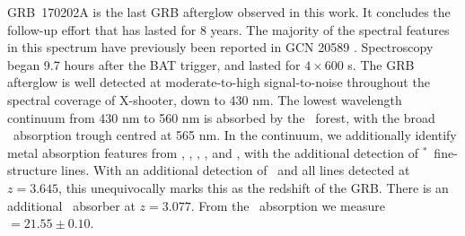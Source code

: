 \documentclass[longauth]{aa}    %
\begin{document}
GRB~170202A is the last GRB afterglow observed in this work. It concludes the
follow-up effort that has lasted for 8 years. The majority of the spectral
features in this spectrum have previously been reported in GCN 20589
\citep{GCN20589}. Spectroscopy began 9.7 hours after the BAT trigger, and lasted
for $4 \times 600$ s. The GRB afterglow is well detected at moderate-to-high
signal-to-noise throughout the spectral coverage of X-shooter, down to 430 nm.
The lowest wavelength continuum from 430 nm to 560 nm is absorbed by the
\lya~forest, with the broad \lya~absorption trough centred at 565 nm. In the
continuum, we additionally identify metal absorption features from \SIii, \civ,
\SIiv, \feii, and \mgii, with the additional detection of
\SIii$^*$~fine-structure lines. With an additional detection of \oiii~and all
lines detected at $z=3.645$, this unequivocally marks this as the redshift of
the GRB. There is an additional \civ~absorber at $z = 3.077$. From the
\lya~absorption we measure \nh$= 21.55 \pm 0.10$.

%
%
\end{document}
